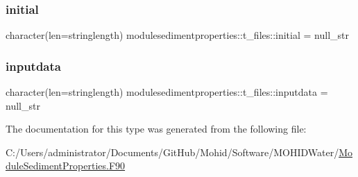 \mbox{\label{structmodulesedimentproperties_1_1t__files_a0b30a8d1fb7f8e07833ce0c9fd718496}} 
\subsubsection{\texorpdfstring{initial}{initial}}
{\footnotesize\ttfamily character(len=stringlength) modulesedimentproperties\+::t\+\_\+files\+::initial = null\+\_\+str\hspace{0.3cm}{\ttfamily [private]}}

\mbox{\label{structmodulesedimentproperties_1_1t__files_ac239b08070db52c8d5779b636fc48cf2}} 
\subsubsection{\texorpdfstring{inputdata}{inputdata}}
{\footnotesize\ttfamily character(len=stringlength) modulesedimentproperties\+::t\+\_\+files\+::inputdata = null\+\_\+str\hspace{0.3cm}{\ttfamily [private]}}



The documentation for this type was generated from the following file\+:\begin{DoxyCompactItemize}
\item 
C\+:/\+Users/administrator/\+Documents/\+Git\+Hub/\+Mohid/\+Software/\+M\+O\+H\+I\+D\+Water/\mbox{\hyperlink{_module_sediment_properties_8_f90}{Module\+Sediment\+Properties.\+F90}}\end{DoxyCompactItemize}
